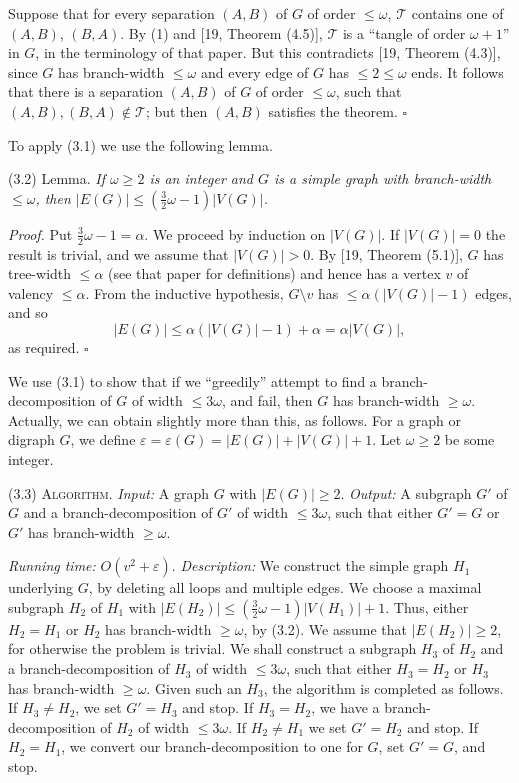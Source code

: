 Suppose that for every separation $(A, B)$ of $G$ of order $\le \omega$, $\mathscr{T}$ contains one of $(A, B)$, $(B, A)$. By (1) and [19, Theorem (4.5)], $\mathscr{T}$ is a ``tangle of order $\omega + 1$'' in $G$, in the terminology of that paper. But this contradicts [19, Theorem (4.3)], since $G$ has branch-width $\le \omega$ and every edge of $G$ has $\le 2 \le \omega$ ends. It follows that there is a separation $(A, B)$ of $G$ of order $\le \omega$, such that $(A, B), (B, A) \notin \mathscr{T}$; but then $(A, B)$ satisfies the theorem. $\square$

To apply (3.1) we use the following lemma.

\stmt
(3.2) Lemma. \textit{If $\omega \ge 2$ is an integer and $G$ is a simple graph with branch-width $\le \omega$, then $|E(G)| \le (\frac{3}{2}\omega - 1) |V(G)|$.}

\textit{Proof.} Put $\frac{3}{2}\omega - 1 = \alpha$. We proceed by induction on $|V(G)|$. If $|V(G)| = 0$ the result is trivial, and we assume that $|V(G)| > 0$. By [19, Theorem (5.1)], $G$ has tree-width $\le \alpha$ (see that paper for definitions) and hence has a vertex $v$ of valency $\le \alpha$. From the inductive hypothesis, $G \setminus v$ has $\le \alpha(|V(G)| - 1)$ edges, and so
\begin{equation*}
|E(G)| \le \alpha(|V(G)| - 1) + \alpha = \alpha |V(G)|,
\end{equation*}
as required. $\square$

We use (3.1) to show that if we ``greedily'' attempt to find a branch-decomposition of $G$ of width $\le 3\omega$, and fail, then $G$ has branch-width $\ge \omega$. Actually, we can obtain slightly more than this, as follows. For a graph or digraph $G$, we define $\varepsilon = \varepsilon(G) = |E(G)| + |V(G)| + 1$. Let $\omega \ge 2$ be some integer.

\stmt
(3.3) \textsc{Algorithm}. \textit{Input:} A graph $G$ with $|E(G)| \ge 2$. \textit{Output:} A subgraph $G'$ of $G$ and a branch-decomposition of $G'$ of width $\le 3\omega$, such that either $G' = G$ or $G'$ has branch-width $\ge \omega$.

\textit{Running time:} $O(v^2 + \varepsilon)$. \textit{Description:} We construct the simple graph $H_1$ underlying $G$, by deleting all loops and multiple edges. We choose a maximal subgraph $H_2$ of $H_1$ with $|E(H_2)| \le (\frac{3}{2}\omega - 1) |V(H_1)| + 1$. Thus, either $H_2 = H_1$ or $H_2$ has branch-width $\ge \omega$, by (3.2). We assume that $|E(H_2)| \ge 2$, for otherwise the problem is trivial. We shall construct a subgraph $H_3$ of $H_2$ and a branch-decomposition of $H_3$ of width $\le 3\omega$, such that either $H_3 = H_2$ or $H_3$ has branch-width $\ge \omega$. Given such an $H_3$, the algorithm is completed as follows. If $H_3 \ne H_2$, we set $G' = H_3$ and stop. If $H_3 = H_2$, we have a branch-decomposition of $H_2$ of width $\le 3\omega$. If $H_2 \ne H_1$ we set $G' = H_2$ and stop. If $H_2 = H_1$, we convert our branch-decomposition to one for $G$, set $G' = G$, and stop.
